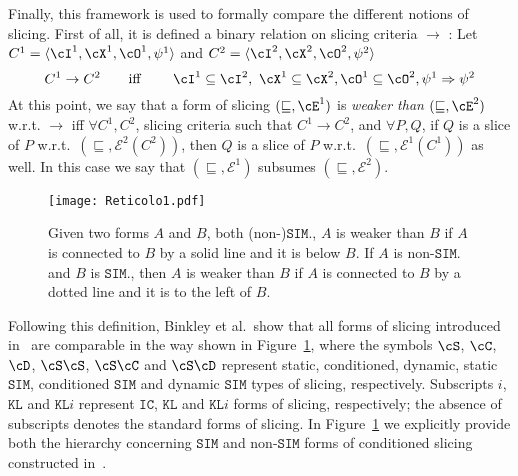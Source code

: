 \documentclass[prodmode,acmtocl]{acmsmall}
\def\prog{\ensuremath{P}\xspace}
\def\progq{\ensuremath{Q}\xspace}
\def\crit{\ensuremath{C}\xspace}
\def\KL{\ensuremath{\mathtt{KL}}\xspace}
\def\KLi{\ensuremath{\mathtt{KL}i}\xspace}
\def\IC{\ensuremath{\mathtt{IC}}\xspace}
\def\SIM{\ensuremath{\mathtt{SIM}}\xspace}
\newcommand{\Ra}{\Rightarrow}
\def\tuple#1{\langle #1 \rangle}
\newcommand{\0}{\mbox{\bf 0}}
\begin{document}
Finally, this framework is used to formally compare the different notions of
slicing.  First of all, it is defined a binary relation on slicing criteria
$\rightarrow$ \cite{AForm}: Let $\crit^1=\tuple{\cI^1,\cX^1,\cO^1,\psi^1}$ and $\crit^2=\tuple{\cI^2,\cX^2,\cO^2,\psi^2}$
\begin{equation}\label{eq:defrelcrit}
\crit^1 \rightarrow \crit^2\qquad \mbox{iff}\ 
\qquad \cI^1\subseteq\cI^2,\ \cX^1\subseteq\cX^2, \cO^1\subseteq\cO^2, \psi^1\Ra\psi^2
\end{equation}
At this point, we say that a form of
slicing $(\sqsubseteq, \cE^1)$ is \emph{weaker than} $(\sqsubseteq,
\cE^2)$ w.r.t. \small$\rightarrow$ \normalsize iff $\forall \crit^1,
\crit^2$, slicing criteria such that $\crit^1 \rightarrow \crit^2$,
and $\forall \prog, \progq$, if $\progq$ is a slice of $\prog$
w.r.t.\ $(\sqsubseteq, \mathcal{E}^2(\crit^2))$, then $\progq$ is a
slice of $\prog$ w.r.t.\ $(\sqsubseteq, \mathcal{E}^1(\crit^1))$ as
well. In this case we say that $(\sqsubseteq, \mathcal{E}^1)$ subsumes $(\sqsubseteq, \mathcal{E}^2)$.
\begin{figure}[tbp]
  \centering
  \texttt{[image: Reticolo1.pdf]}
  \caption{Given two forms $A$ and $B$, both (non-)$\SIM$., $A$ is
    weaker than $B$ if $A$ is connected to $B$ by a solid line and it
    is below $B$. If $A$ is non-$\SIM$. and $B$ is $\SIM$., then $A$
    is weaker than $B$ if $A$ is connected to $B$ by a dotted line and
    it is to the left of $B$.\label{fig:Ret1}}
\end{figure}
Following this definition, Binkley et al.~show that all forms of
slicing introduced in~\cite{AForm} are comparable in the way shown in
Figure~\ref{fig:Ret1}, where the symbols $\cS$, $\cC$, $\cD$,
$\cS\cS$, $\cS\cC$ and $\cS\cD$ represent static, conditioned,
dynamic, static $\SIM$, conditioned $\SIM$ and dynamic $\SIM$ types of
slicing, respectively.  Subscripts $i$, $\KL$ and $\KLi$ represent
$\IC$, $\KL$ and $\KLi$ forms of slicing, respectively; the absence of
subscripts denotes the standard forms of slicing.  In
Figure~\ref{fig:Ret1} we explicitly provide both the hierarchy
concerning $\SIM$ and non-$\SIM$ forms of conditioned slicing
constructed in~\cite{AForm}.


\label{appendix}
\end{document}
